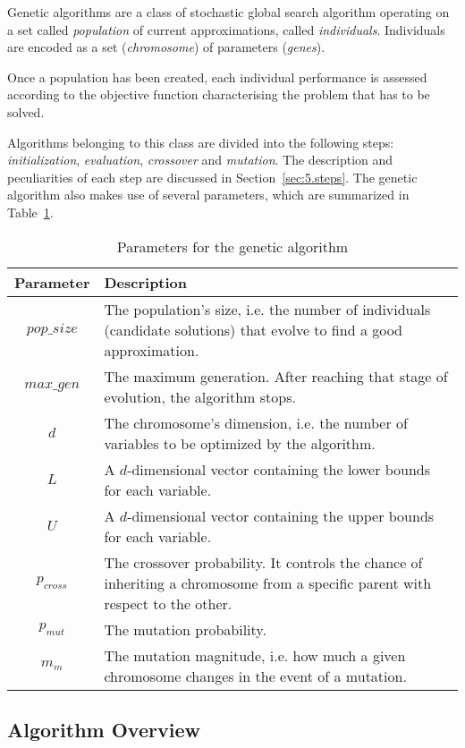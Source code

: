 Genetic algorithms are a class of stochastic global search algorithm
operating on a set called \textit{population} of current approximations,
called \textit{individuals}.
Individuals are encoded as a set (\textit{chromosome}) of parameters (\textit{genes}).

Once a population has been created, each individual performance is assessed
according to the objective function characterising the problem that has to be solved.

Algorithms belonging to this class are divided into the following steps:
\textit{initialization}, \textit{evaluation}, \textit{crossover} and \textit{mutation}.
The description and peculiarities of each step are discussed in Section~\ref{sec:5.steps}.
The genetic algorithm also makes use of several parameters, which are summarized
in Table~\ref{tab:ga_params}.

\begin{table}[]
	\centering
	\begin{tabularx}{\linewidth}{c X}
		\toprule
		\textbf{Parameter} & \textbf{Description} \\ \midrule
		$pop\_size$        & The population's size, i.e. the number of individuals (candidate solutions) that evolve to find a good approximation. \\
		$max\_gen$         & The maximum generation. After reaching that stage of evolution, the algorithm stops. \\
		$d$           	   & The chromosome's dimension, i.e. the number of variables to be optimized by the algorithm. \\
		$L$           	   & A $d$-dimensional vector containing the lower bounds for each variable. \\
		$U$				   & A $d$-dimensional vector containing the upper bounds for each variable. \\
		$p_{cross}$		   & The crossover probability. It controls the chance of inheriting a chromosome from a specific parent with respect to the other. \\
		$p_{mut}$		   & The mutation probability. \\
		$m_m$			   & The mutation magnitude, i.e. how much a given chromosome changes in the event of a mutation. \\ \bottomrule
	\end{tabularx}
	\caption{Parameters for the genetic algorithm}
	\label{tab:ga_params}
\end{table}

\subsection{Algorithm Overview}


